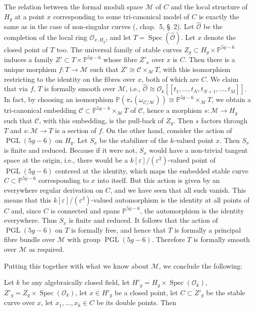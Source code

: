 \documentclass[10pt]{amsart}
\theoremstyle{plain}
\theoremstyle{definition}
\DeclareMathOperator{\Spec}{Spec}
\DeclareMathOperator{\PGL}{PGL}
\newcommand{\cO}{\mathcal{O}}
\begin{document}
The relation between the formal moduli space $\mathscr{M}$ of $C$ and the local structure of $H_g$ at a point $x$ corresponding to some tri-canonical model of $C$ is exactly the same as in the case of non-singular curves (\cite{M1}, chap.~5, \S~2). Let $\widehat{\cO}$ be the completion of the local ring $\cO_{x,H_g}$, and let $T = \Spec(\widehat{\cO})$. Let $x$ denote the closed point of $T$ too. The universal family of stable curves $Z_g \subset H_g \times \mathbb{P}^{5g-6}$ induces a family $Z' \subset T \times \mathbb{P}^{5g-6}$ whose fibre $Z'_x$ over $x$ is $C$. Then there is a unique morphism $f: T \to \mathscr{M}$ such that $Z' \cong \mathscr{C} \times_{\mathscr{M}} T$, with this isomorphism restricting to the identity on the fibres over $x$, both of which are $C$. We claim that via $f$, $T$ is formally smooth over $\mathscr{M}$, i.e., $\widehat{\cO} \cong \mathcal{O}_k[[t_1, \ldots, t_N, t_{N+1}, \ldots, t_M]]$. In fact, by choosing an isomorphism $\mathbb{P}(\pi_*(\omega_{\mathscr{C}/\mathscr{M}})) \cong \mathbb{P}^{5g-6} \times_{\mathscr{M}} T$, we obtain a tri-canonical embedding $\mathscr{C} \subset \mathbb{P}^{5g-6} \times_{\mathscr{M}} T$ of $\mathscr{C}$, hence a morphism $s: \mathscr{M} \to H_g$ such that $\mathscr{C}$, with this embedding, is the pull-back of $Z_g$. Then $s$ factors through $T$ and $s: \mathscr{M} \to T$ is a section of $f$. On the other hand, consider the action of $\PGL(5g-6)$ on $H_g$. Let $S_x$ be the stabilizer of the $k$-valued point $x$. Then $S_x$ is finite and reduced. Because if it were not, $S_x$ would have a non-trivial tangent space at the origin, i.e., there would be a $k[\varepsilon]/(\varepsilon^2)$-valued point of $\PGL(5g-6)$ centered at the identity, which maps the embedded stable curve $C \subset \mathbb{P}^{5g-6}$ corresponding to $x$ into itself. But this action is given by an everywhere regular derivation on $C$, and we have seen that all such vanish. This means that this $k[\varepsilon]/(\varepsilon^2)$-valued automorphism is the identity at all points of $C$ and, since $C$ is connected and spans $\mathbb{P}^{5g-6}$, the automorphism is the identity everywhere. Thus $S_x$ is finite and reduced. It follows that the action of $\PGL(5g-6)$ on $T$ is formally free, and hence that $T$ is formally a principal fibre bundle over $\mathscr{M}$ with group $\PGL(5g-6)$. Therefore $T$ is formally smooth over $\mathscr{M}$ as required.

Putting this together with what we know about $\mathscr{M}$, we conclude the following:

Let $k$ be any algebraically closed field, let $H'_g = H_g \times \Spec(\mathcal{O}_k)$, $Z'_g = Z_g \times \Spec(\mathcal{O}_k)$, let $x \in H'_g$ be a closed point, let $C \subset Z'_g$ be the stable curve over $x$, let $x_1, \ldots, x_k \in C$ be its double points. Then
\end{document}
